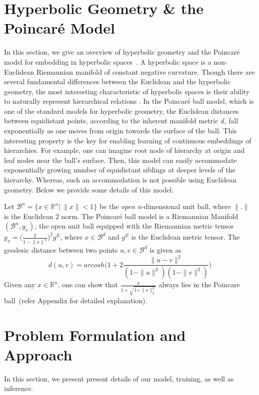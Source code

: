 \documentclass[11pt,a4paper]{article}
\def\R{\mathbb{R}}
\begin{document}
\section{Hyperbolic Geometry \& the Poincar\'e Model}\label{sec:backpoi}
In this section, we give an overview of hyperbolic geometry and the Poincar\'e model for embedding in hyperbolic spaces~\citep{poincare}.
A hyperbolic space is a non-Euclidean Riemannian manifold of constant negative curvature. Though there are several fundamental differences between the Euclidean and the hyperbolic geometry, the most interesting characteristic of hyperbolic spaces is their ability to naturally represent hierarchical relations \citep{complexhyperbolic}.
In the Poincar\'e ball model, which is one of the standard models for hyperbolic geometry, the Euclidean distances between equidistant points, according to the inherent manifold metric $d$, fall exponentially as one moves from origin towards the surface of the ball. This interesting property is the key for enabling learning of continuous embeddings of hierarchies. For example, one can imagine root node of hierarchy at origin and leaf nodes near the ball's surface. Then, this model can easily accommodate exponentially growing number of equidistant siblings at deeper levels of the hierarchy. Whereas, such an accommodation is not possible using Euclidean geometry. Below we provide some details of this model.\par
Let $\mathcal{B}^{n} = \{x \in \mathbb{R}^{n} \vert \   \|x\| < 1\}$ be the \textit{open n-}dimensional unit ball, where $\|.\|$ is the Euclidean 2 norm. The Poincar\'e ball model is a Riemannian Manifold $(\mathcal{B}^{n}, g_{x})$, the open unit ball equipped with the Riemannian metric tensor $g_{x} = \Bigg(\frac{2}{1-{\|x\|}^2}\Bigg)^{2}g^{E}$, where $x \in \mathcal{B}^{d}$ and $g^{E}$ is the Euclidean metric tensor. The geodesic distance between two points $u, v \in \mathcal{B}^{d}$ is given as
\begin{equation}
   d(u,v) = arcosh\Bigg( 1 + 2\frac{\|u-v\|^{2}}{(1-\|u\|^{2})(1-\|v\|^{2})}\Bigg)
  \label{eq:dpoincare}
\end{equation}
Given any $x\in\R^n$, one can show that $\frac{x}{1+\sqrt{1+\|x\|_2^2}}$ always lies in the Poincare ball~(refer Appendix for detailed explanation).

\section{Problem Formulation and Approach}
In this section, we present present details of our model, training, as well as inference.
\end{document}
